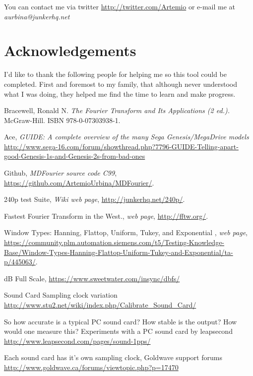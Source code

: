 \documentclass[10pt,a4paper]{report}
\begin{document}
\begin{appendices}
You can contact me via twitter \url{http://twitter.com/Artemio} or e-mail me at \textit{aurbina@junkerhq.net}

\chapter{Acknowledgements}

I'd like to thank the following people for helping me so this tool could be completed. First and foremost to my family, that although never understood what I was doing, they helped me find the time to learn and make progress.

\end{appendices}

\begin{thebibliography}{9}
	Bracewell, Ronald N. 
	\textit{The Fourier Transform and Its Applications (2 ed.).}
	McGraw-Hill. ISBN 978-0-07303938-1.
	
	Ace, \textit{GUIDE: A complete overview of the many Sega Genesis/MegaDrive models}
	\url{http://www.sega-16.com/forum/showthread.php?7796-GUIDE-Telling-apart-good-Genesis-1s-and-Genesis-2s-from-bad-ones}
	
	Github,
	\textit{MDFourier source code C99},
	\url{https://github.com/ArtemioUrbina/MDFourier/}.
	
	240p test Suite,
	\textit{Wiki web page},
	\url{http://junkerhq.net/240p/}.
	
	Fastest Fourier Transform in the West.,
	\textit{web page},
	\url{http://fftw.org/}.
	
	Window Types: Hanning, Flattop, Uniform, Tukey, and Exponential ,
	\textit{web page},
	\url{https://community.plm.automation.siemens.com/t5/Testing-Knowledge-Base/Window-Types-Hanning-Flattop-Uniform-Tukey-and-Exponential/ta-p/445063/}.
	
	dB Full Scale, 
	\url{https://www.sweetwater.com/insync/dbfs/}
	
	Sound Card Sampling clock variation
	\url{http://www.stu2.net/wiki/index.php/Calibrate_Sound_Card/}
	
	So how accurate is a typical PC sound card? How stable is the output? How would one measure this?
	Experiments with a PC sound card by leapsecond
	\url{http://www.leapsecond.com/pages/sound-1pps/}
	
	Each sound card has it's own sampling clock, Goldwave support forums
	\url{http://www.goldwave.ca/forums/viewtopic.php?p=17470}
	

\end{thebibliography}
\end{document}
